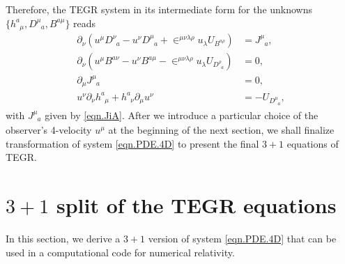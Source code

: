 \documentclass[
10pt, %
a4paper, %
oneside, %
twocolumn,
headinclude,footinclude, %
BCOR5mm, %
]{scrartcl}
\newcommand{\IP}[1]{{\color{Red}[IP:\ \ #1]}}
\newcommand{\pd}[1]{\partial_{#1}}
\newcommand{\tetrsymbol}{h}
\newcommand{\tetr}[2]{\tetrsymbol^{#1}_{\phantom{#1}#2}}
\newcommand{\D}[1]{\partial_{#1}} %
\newcommand{\Dm}[2]{D_{\phantom{#2}#1}^{#2}}	%
\newcommand{\Bm}[2]{B^{#1#2}}	%
\newcommand{\w}[2]{W^{#1}_{\phantom{#1}#2}}
\newcommand{\Um}{U}%
\newcommand{\EMmat}[2]{\sigma^{#1}_{\ \,#2}}
\newcommand{\LCsymb}{\bm{\in}}    %
\newcommand{\KD}[2]{\delta^{#1}_{\ #2}}
\newcommand{\NC}[2]{J^{#2}_{\phantom{#2}#1}}
\begin{document}
	Therefore, the TEGR system in its intermediate form for the 
	unknowns $ \{\tetr{a}{\mu},\Dm{a}{\mu},\Bm{a}{\mu}\} $  reads
	\begin{subequations}\label{eqn.PDE.4D}
		\begin{align}%
			\D{\nu}(u^\mu\Dm{a}{\nu} - u^\nu \Dm{a}{\mu} + 
			\LCsymb^{\mu\nu\lambda\rho}u_\lambda 
			\Um_{\Bm{a}{\rho}})
			& =	\NC{a}{\mu},\label{eT}\\[2mm]
			\D{\nu}(u^\mu \Bm{a}{\nu} - u^\nu \Bm{a}{\mu} - 
			\LCsymb^{\mu\nu\lambda\rho}u_\lambda 
			\Um_{\Dm{a}{\rho}}) 
			& = 0,\label{bT}\\[2mm]
			\pd{\mu}\NC{a}{\mu}
			& = 0, \\[2mm] 
			u^\nu\D{\nu}\tetr{a}{\mu} + \tetr{a}{\nu}\D{\mu}u^\nu &=-\Um_{\Dm{a}{\mu}},
			\label{tetr}
		\end{align}
	\end{subequations}
	with $ \NC{a}{\mu} $ given by \eqref{eqn.JiA}. After we introduce a particular choice of the 
	observer's 4-velocity $ u^\mu $ at the beginning of the next section, we shall finalize 
	transformation of 
	system \eqref{eqn.PDE.4D} to 
	present the final $ 3+1 $ equations of TEGR.
	
	
	
	
	\section{$ 3+1 $ split of the TEGR equations}	\label{sec.31}
	
	
	In this section, we derive a $ 3+1 $ version of system \eqref{eqn.PDE.4D} that can be used in a 
	computational code for numerical relativity.
	
\end{document}
